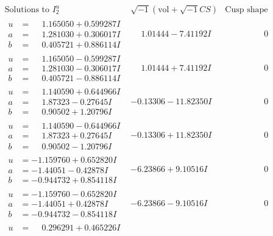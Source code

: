\documentclass[1p]{elsarticle_modified}
\theoremstyle{definition}
\newcommand{\I}{\sqrt{-1}}
\begin{document}
$$\begin{array}{c|c|c}
\text{Solutions to }I^u_{2}& \I (\text{vol} + \sqrt{-1}CS) & \text{Cusp shape}\\
 \hline 
\begin{aligned}
u &= \phantom{-}1.165050 + 0.599287 I \\
a &= \phantom{-}1.281030 + 0.306017 I \\
b &= \phantom{-}0.405721 + 0.886114 I\end{aligned}
 & \phantom{-}1.01444 - 7.41192 I & \phantom{-0.000000 } 0 \\ \hline\begin{aligned}
u &= \phantom{-}1.165050 - 0.599287 I \\
a &= \phantom{-}1.281030 - 0.306017 I \\
b &= \phantom{-}0.405721 - 0.886114 I\end{aligned}
 & \phantom{-}1.01444 + 7.41192 I & \phantom{-0.000000 } 0 \\ \hline\begin{aligned}
u &= \phantom{-}1.140590 + 0.644966 I \\
a &= \phantom{-}1.87323 - 0.27645 I \\
b &= \phantom{-}0.90502 + 1.20796 I\end{aligned}
 & -0.13306 - 11.82350 I & \phantom{-0.000000 } 0 \\ \hline\begin{aligned}
u &= \phantom{-}1.140590 - 0.644966 I \\
a &= \phantom{-}1.87323 + 0.27645 I \\
b &= \phantom{-}0.90502 - 1.20796 I\end{aligned}
 & -0.13306 + 11.82350 I & \phantom{-0.000000 } 0 \\ \hline\begin{aligned}
u &= -1.159760 + 0.652820 I \\
a &= -1.44051 - 0.42878 I \\
b &= -0.944732 + 0.854118 I\end{aligned}
 & -6.23866 + 9.10516 I & \phantom{-0.000000 } 0 \\ \hline\begin{aligned}
u &= -1.159760 - 0.652820 I \\
a &= -1.44051 + 0.42878 I \\
b &= -0.944732 - 0.854118 I\end{aligned}
 & -6.23866 - 9.10516 I & \phantom{-0.000000 } 0 \\ \hline\begin{aligned}
u &= \phantom{-}0.296291 + 0.465226 I \\

\end{aligned}
\end{array}$$
\end{document}
